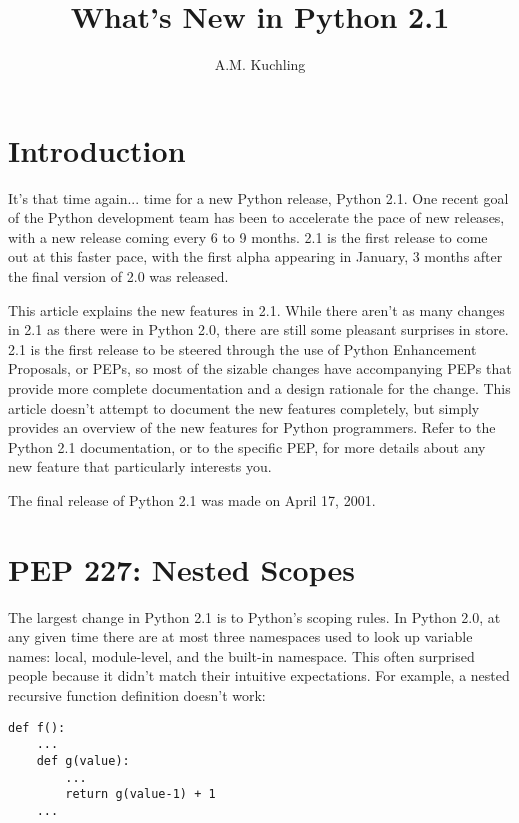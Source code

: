 \documentclass{howto}
\title{What's New in Python 2.1}
\author{A.M. Kuchling}
\begin{document}
\maketitle\tableofcontents

\section{Introduction}

It's that time again... time for a new Python release, Python 2.1.
One recent goal of the Python development team has been to accelerate
the pace of new releases, with a new release coming every 6 to 9
months. 2.1 is the first release to come out at this faster pace, with
the first alpha appearing in January, 3 months after the final version
of 2.0 was released.

This article explains the new features in 2.1.  While there aren't as
many changes in 2.1 as there were in Python 2.0, there are still some
pleasant surprises in store.  2.1 is the first release to be steered
through the use of Python Enhancement Proposals, or PEPs, so most of
the sizable changes have accompanying PEPs that provide more complete
documentation and a design rationale for the change.  This article
doesn't attempt to document the new features completely, but simply
provides an overview of the new features for Python programmers.
Refer to the Python 2.1 documentation, or to the specific PEP, for
more details about any new feature that particularly interests you.

The final release of Python 2.1 was made on April 17, 2001.

\section{PEP 227: Nested Scopes}

The largest change in Python 2.1 is to Python's scoping rules.  In
Python 2.0, at any given time there are at most three namespaces used
to look up variable names: local, module-level, and the built-in
namespace.  This often surprised people because it didn't match their
intuitive expectations.  For example, a nested recursive function
definition doesn't work:

\begin{verbatim}
def f():
    ...
    def g(value):
        ...
        return g(value-1) + 1
    ...
\end{verbatim}
\end{document}
